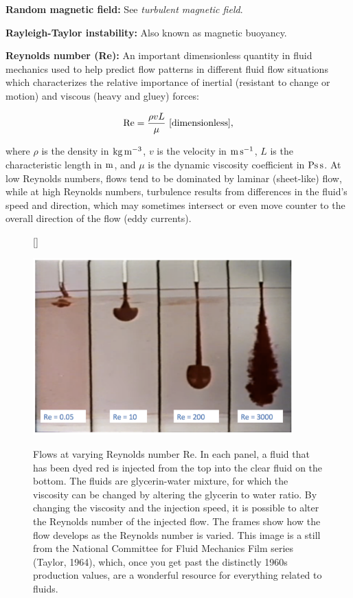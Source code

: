 \documentclass[a4paper,10pt]{article}
\begin{document}
{\noindent}\textbf{Random magnetic field:} See \textit{turbulent magnetic field}. 

{\noindent}\textbf{Rayleigh-Taylor instability:} Also known as magnetic buoyancy.

{\noindent}\textbf{Reynolds number (Re):}  An important dimensionless quantity in fluid mechanics used to help predict flow patterns in different fluid flow situations which characterizes the relative importance of inertial (resistant to change or motion) and viscous (heavy and gluey) forces:

\begin{align*}
    {\rm Re} = \frac{\rho vL}{\mu} ~ [{\rm dimensionless}],
\end{align*}

{\noindent}where $\rho$ is the density in ${\rm kg\,m^{-3}}$, $v$ is the velocity in ${\rm m\,s^{-1}}$, $L$ is the characteristic length in ${\rm m}$, and $\mu$ is the dynamic viscosity coefficient in ${\rm Ps\,s}$. At low Reynolds numbers, flows tend to be dominated by laminar (sheet-like) flow, while at high Reynolds numbers, turbulence results from differences in the fluid's speed and direction, which may sometimes intersect or even move counter to the overall direction of the flow (eddy currents).

\begin{figure}[h]
    [\FBwidth]
    {\caption{\footnotesize{Flows at varying Reynolds number Re. In each panel, a fluid that has been dyed red is injected from the top into the clear fluid on the bottom. The fluids are glycerin-water mixture, for which the viscosity can be changed by altering the glycerin to water ratio. By changing the viscosity and the injection speed, it is possible to alter the Reynolds number of the injected flow. The frames show how the flow develops as the Reynolds number is varied. This image is a still from the National Committee for Fluid Mechanics Film series (Taylor, 1964), which, once you get past the distinctly 1960s production values, are a wonderful resource for everything related to fluids.}}
    \label{fig:variablezones}}
    {\includegraphics[width=10cm]{figures/ReynoldsNumber.png}}
\end{figure}
\end{document}
